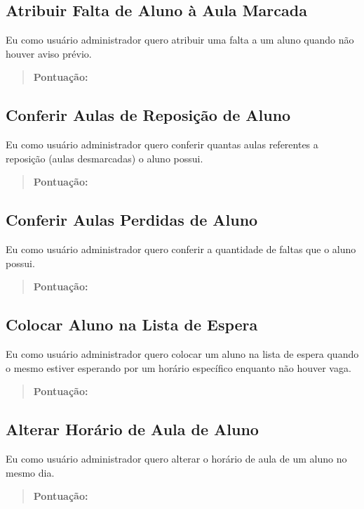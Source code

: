 \subsection[Atribuir Falta de Aluno à Aula Marcada]{Atribuir Falta de Aluno à Aula Marcada}
Eu como usuário administrador quero atribuir uma falta a um aluno quando não
houver aviso prévio.
\begin{quote}
    \textbf{Pontuação:}
\end{quote}

\subsection[Conferir Aulas de Reposição de Aluno]{Conferir Aulas de Reposição de Aluno}
Eu como usuário administrador quero conferir quantas aulas referentes a
reposição (aulas desmarcadas) o aluno possui.
\begin{quote}
    \textbf{Pontuação:}
\end{quote}

\subsection[Conferir Aulas Perdidas de Aluno]{Conferir Aulas Perdidas de Aluno}
Eu como usuário administrador quero conferir a quantidade de faltas que o aluno
possui.
\begin{quote}
    \textbf{Pontuação:}
\end{quote}

\subsection[Colocar Aluno na Lista de Espera]{Colocar Aluno na Lista de Espera}
Eu como usuário administrador quero colocar um aluno na lista de espera quando o
mesmo estiver esperando por um horário específico enquanto não houver vaga.
\begin{quote}
    \textbf{Pontuação:}
\end{quote}

\subsection[Alterar Horário de Aula de Aluno]{Alterar Horário de Aula de Aluno}
Eu como usuário administrador quero alterar o horário de aula de um aluno no
mesmo dia.
\begin{quote}
    \textbf{Pontuação:}
\end{quote}

